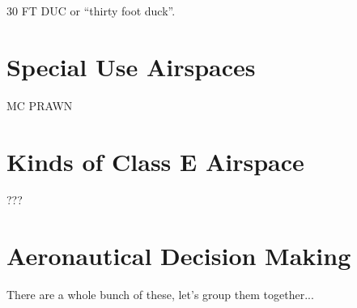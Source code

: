 30 FT DUC or ``thirty foot duck''.

\section{Special Use Airspaces}

MC PRAWN

\section{Kinds of Class E Airspace}

???

\section{Aeronautical Decision Making}

There are a whole bunch of these, let's group them together...



